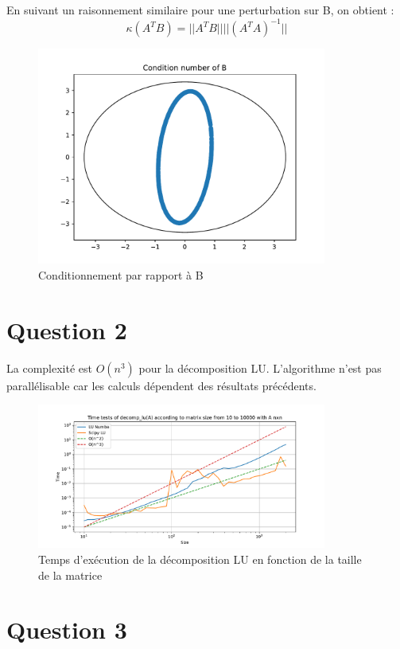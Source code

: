 \documentclass[11pt]{article}
\begin{document}
En suivant un raisonnement similaire pour une perturbation sur B, on obtient :
$$ \kappa(A^T B) = ||A^T B||||(A^T A)^{-1}|| $$

\begin{figure}[ht]
\centering
\includegraphics[width=0.85\textwidth]{images/condition_b.pdf}
\caption{Conditionnement par rapport à B}
\end{figure}
\section*{Question 2}

La complexité est $O(n^3)$ pour la décomposition LU. L'algorithme n'est pas parallélisable car les calculs dépendent des résultats précédents.
\begin{figure}[ht]
\centering
\includegraphics[width=0.85\textwidth]{images/lu_time_tests.pdf}
\caption{Temps d'exécution de la décomposition LU en fonction de la taille de la matrice}
\end{figure}

\section*{Question 3}
\end{document}
